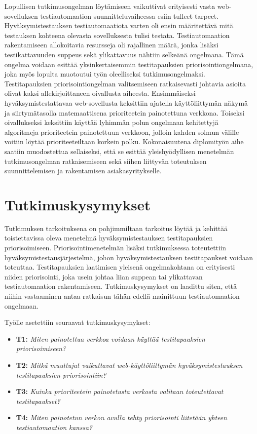   Lopullisen tutkimusongelman löytämiseen vaikuttivat erityisesti vasta web-sovelluksen testiautomaation suunnitteluvaiheessa esiin tulleet tarpeet.
  Hyväksymistestauksen testiautomaatiota varten oli ensin määritettävä mitä testauksen kohteena olevasta sovelluksesta tulisi testata.
  Testiautomaation rakentamiseen allokoitavia resursseja oli rajallinen määrä, jonka lisäksi testikattavuuden suppeus sekä ylikattavuus nähtiin selkeänä ongelmana.
  Tämä ongelma voidaan esittää yksinkertaisemmin testitapauksien priorisointiongelmana, joka myös lopulta muotoutui työn oleelliseksi tutkimusongelmaksi.
  Testitapauksien priorisointiongelman valitsemiseen ratkaisevasti johtavia asioita olivat kaksi allekirjoittaneen oivallusta aiheesta.
  Ensimmäiseksi hyväksymistestattavaa web-sovellusta keksittiin ajatella käyttöliittymän näkymä ja siirtymätasolla matemaattisena prioriteetein painotettuna verkkona.
  Toiseksi oivallukseksi keksittiin käyttää lyhimmän polun ongelmaan kehitettyjä algoritmeja prioriteetein painotettuun verkkoon, jolloin kahden solmun välille voitiin löytää prioriteeteiltaan korkein polku.
  Kokonaisuutena diplomityön aihe saatiin muodostettua sellaiseksi, että se esittää yleishyödyllisen menetelmän tutkimusongelman ratkaisemiseen sekä siihen liittyvän toteutuksen suunnittelemisen ja rakentamisen asiakasyritykselle.

\section{Tutkimuskysymykset} \label{ch:06_tutkimuskysymykset}

  Tutkimuksen tarkoituksena on pohjimmiltaan tarkoitus löytää ja kehittää toistettavissa oleva menetelmä hyväksymistestauksen testitapauksien priorisoimiseen.
  Priorisointimenetelmän lisäksi tutkimuksessa toteutettiin hyväksymistestausjärjestelmä, johon hyväksymistestauksen testitapaukset voidaan toteuttaa.
  Testitapauksien laatimisen yleisenä ongelmakohtana on erityisesti niiden priorisointi, joka usein johtaa liian suppean tai ylikattavan testiautomaation rakentamiseen.
  Tutkimuskysymykset on laadittu siten, että niihin vastaaminen antaa ratkaisun tähän edellä mainittuun testiautomaation ongelmaan.

  Työlle asetettiin seuraavat tutkimuskysymykset:

  \begin{itemize}
    \item \textbf{T1:} \emph{Miten painotettua verkkoa voidaan käyttää testitapauksien priorisoimiseen?}
    \item \textbf{T2:} \emph{Mitkä muuttujat vaikuttavat web-käyttöliittymän hyväksymistestauksen testitapauksien priorisointiin?}
    \item \textbf{T3:} \emph{Kuinka prioriteetein painotetusta verkosta valitaan toteutettavat testitapaukset?}
    \item \textbf{T4:} \emph{Miten painotetun verkon avulla tehty priorisointi liitetään yhteen testiautomaation kanssa?}
  \end{itemize}

